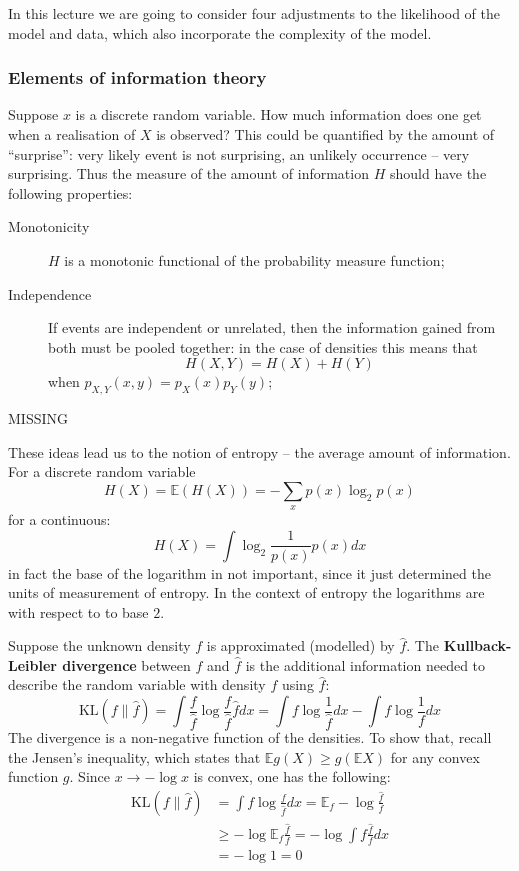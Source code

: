 \documentclass[a4paper]{article}
\newcommand{\brac}[1]{{\left ( #1 \right )}}
\newcommand{\ex}{\mathbb{E}}
\begin{document}
In this lecture we are going to consider four adjustments to the likelihood of
the model and data, which also incorporate the complexity of the model.

\subsubsection{Elements of information theory} %
\label{ssub:elements_of_information_theory}

Suppose $x$ is a discrete random variable. How much information does one get when
a realisation of $X$ is observed? This could be quantified by the amount of ``surprise'':
very likely event is not surprising, an unlikely occurrence -- very surprising.
Thus the measure of the amount of information $H$ should have the following properties:
\begin{description}
	\item[Monotonicity] $H$ is a monotonic functional of the probability measure
	function;
	\item[Independence] If events are independent or unrelated, then the information
	gained from both must be pooled together: in the case of densities this means that
	\[H(X,Y) = H(X)+H(Y)\]
	when $p_{X,Y}(x,y) = p_X(x) p_Y(y)$;
	\item[MISSING]
\end{description}
These ideas lead us to the notion of entropy -- the average amount of information.
For a discrete random variable
\[H(X) = \ex\brac{H(X)} = - \sum_x p(x) \log_2 p(x)\]
for a continuous:
\[H(X) = \int \log_2\frac{1}{p(x)} p(x) dx\]
in fact the base of the logarithm in not important, since it just determined the
units of measurement of entropy. In the context of entropy the logarithms are with
respect to to base $2$.

Suppose the unknown density $f$ is approximated (modelled) by $\hat{f}$.
The \textbf{Kullback-Leibler divergence} between $f$ and $\hat{f}$ is the additional
information needed to describe the random variable with density $f$ using $\hat{f}$:
\[
\text{KL}(f\|\hat{f})
= \int \frac{f}{\hat{f}} \log \frac{f}{\hat{f}} \hat{f} dx
= \int f \log \frac{1}{\hat{f}} dx - \int f \log \frac{1}{f} dx
\]
The divergence is a non-negative function of the densities. To show that, recall
the Jensen's inequality, which states that $\ex g(X) \geq g(\ex X)$ for any convex
function $g$. Since $x\to -\log x$ is convex, one has the following:
\begin{align*}
	\text{KL}(f\|\hat{f})
	&= \int f \log \frac{f}{\hat{f}} dx = \ex_f -\log \frac{\hat{f}}{f} \\
	&\geq -\log \ex_f \frac{\hat{f}}{f} = -\log \int f \frac{\hat{f}}{f} dx \\
	&= -\log 1 = 0
\end{align*}
\end{document}
